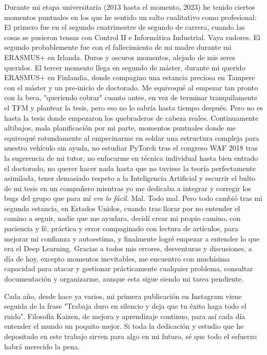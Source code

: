 Durante mi etapa universitaria (2013 hasta el momento, 2023) he tenido ciertos momentos puntuales en los que he sentido un salto cualitativo como profesional: El primero fue en el segundo cuatrimestre de segundo de carrera, cuando las cosas se pusieron tensas con Control II e Informática Industrial. Vaya sudores. El segundo probablemente fue con el fallecimiento de mi madre durante mi ERASMUS+ en Irlanda. Duros y oscuros momentos, alejado de mis seres queridos. El tercer momento llega en segundo de máster, durante mi querido ERASMUS+ en Finlandia, donde compagino una estancia preciosa en Tampere con el máster y un pre-inicio de doctorado. Me equivoqué al empezar tan pronto con la beca, "queriendo cobrar" cuanto antes, en vez de terminar tranquilamente el TFM y plantear la tesis, pero eso no lo sabría hasta tiempo después. Pero no es hasta la tesis donde empezaron los quebraderos de cabeza reales. Continuamente altibajos, mala planificación por mi parte, momentos puntuales donde me equivoqué rotundamente al empecinarme en soldar una estructura compleja para nuestro vehículo sin ayuda, no estudiar PyTorch tras el congreso WAF 2018 tras la sugerencia de mi tutor, no enfocarme en técnica individual hasta bien entrado el doctorado, no querer hacer nada hasta que no tuviese la teoría perfectamente asimilada, tener demasiado respeto a la Inteligencia Artificial y escurrir el bulto de mi tesis en un compañero mientras yo me dedicaba a integrar y corregir los bugs del grupo que para mí \textit{era lo fácil}. Mal. Todo mal. Pero todo cambió tras mi segunda estancia, en Estados Unidos, cuando tras llorar por no entender el camino a seguir, nadie que me ayudara, decidí crear mi propio camino, con paciencia y fé, práctica y error compaginado con lectura de artículos, para mejorar mi confianza y autoestima, y finalmente logré empezar a entender lo que era el Deep Learning. Gracias a todos mis errores, desventuras y discusiones, a día de hoy, excepto momentos inevitables, me encuentro con muchísima capacidad para atacar y gestionar prácticamente cualquier problema, consultar documentación y organizarme, aunque esta sigue siendo mi tarea pendiente.

Cada año, desde hace ya varios, mi primera publicación en Instagram viene seguida de la frase "Trabaja duro en silencio y deja que tu éxito haga todo el ruido". Filosofía Kaizen, de mejora y aprendizaje continuo, para así cada día entender el mundo un poquito mejor. Si toda la dedicación y estudio que he depositado en este trabajo sirven para algo en mi futuro, sé que todo el esfuerzo habrá merecido la pena.

